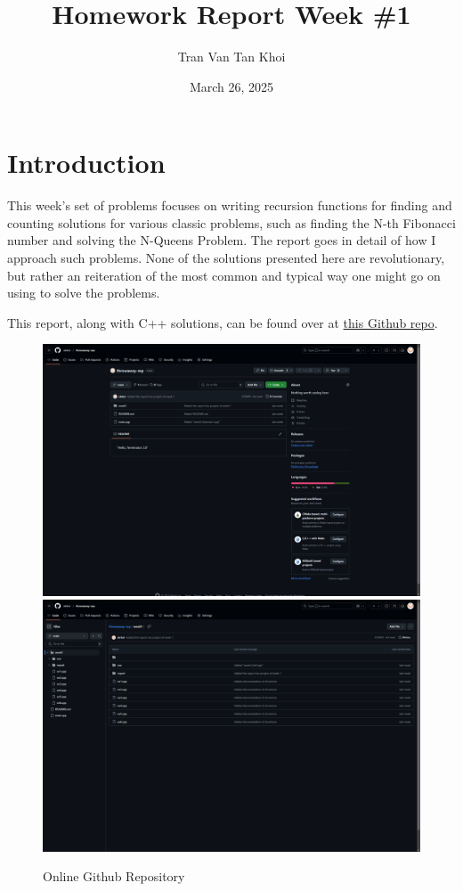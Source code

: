 \documentclass{article}
\author{Tran Van Tan Khoi}
\title{Homework Report Week \#1}
\date{March 26, 2025}
\begin{document}
    \maketitle

    \section{Introduction}
    
    This week's set of problems focuses on writing recursion functions for finding and counting solutions for various classic problems, such as finding the N-th Fibonacci number and solving the N-Queens Problem. The report goes in detail of how I approach such problems. None of the solutions presented here are revolutionary, but rather an reiteration of the most common and typical way one might go on using to solve the problems.


    This report, along with C++ solutions, can be found over at \href{https://github.com/xtrkoi/throwaway-rep}{this Github repo}.

    \begin{figure}[!h]
        \centering
        \includegraphics[width=12cm]{figure1.png}\hfil
        \includegraphics[width=12cm]{figure2.png}
        \caption{Online Github Repository}
    \end{figure}
\end{document}
